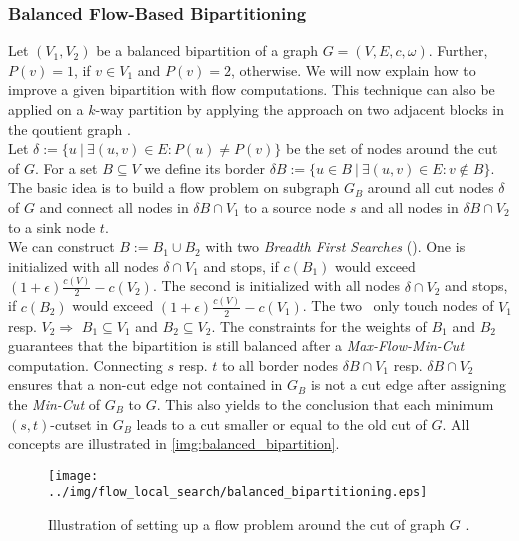 \subsubsection{Balanced Flow-Based Bipartitioning}
\label{sec:balanced_bipartitioning}
Let $(V_1,V_2)$ be a balanced bipartition of a graph $G = (V,E,c,\omega)$. 
Further, $P(v) = 1$, if $v \in V_1$ and
$P(v) = 2$, otherwise. We will now explain how to improve a given
bipartition with flow computations. This technique can also be applied on a $k$-way 
partition by applying the approach on two adjacent blocks in the qoutient graph \cite{sanders2011engineering}. \\
Let $\delta := \{ u\ |\ \exists (u,v) \in E: P(u) \neq P(v) \}$ be the set of nodes
around the cut of $G$. For a set $B \subseteq V$ we define its border 
$\delta B := \{u \in B\ |\ \exists (u,v) \in E: v \notin B\}$.
The basic idea is to build a flow problem on subgraph $G_B$ around all cut nodes $\delta$ of 
$G$ and connect all nodes in $\delta B \cap V_1$ to a source node $s$ and all nodes in 
$\delta B \cap V_2$ to a sink node $t$. \\
We can construct $B := B_1 \cup B_2$ with two \emph{Breadth First Searches} (\BFS). 
One is initialized with all nodes $\delta \cap V_1$ and stops, if $c(B_1)$ would 
exceed $(1+\epsilon)\frac{c(V)}{2} - c(V_2)$. The second is initialized with 
all nodes $\delta \cap V_2$ and stops, if $c(B_2)$ would exceed 
$(1+\epsilon)\frac{c(V)}{2} - c(V_1)$. The two \BFS~only touch nodes of $V_1$ resp. $V_2 \Rightarrow$
$B_1 \subseteq V_1$ and $B_2 \subseteq V_2$. The constraints for the weights of $B_1$
and $B_2$ guarantees that the bipartition is still balanced after a \emph{Max-Flow-Min-Cut}
computation. Connecting $s$ resp. $t$ to all border nodes $\delta B \cap V_1$ resp.
$\delta B \cap V_2$ ensures that a non-cut edge not contained in $G_B$ is not a cut edge after
assigning the \emph{Min-Cut} of $G_B$ to $G$. This also yields to the conclusion that each
minimum $(s,t)$-cutset in $G_B$ leads to a cut smaller or equal to the old cut of $G$. All
concepts are illustrated in \autoref{img:balanced_bipartition}.

\begin{figure}
\centering
\texttt{[image: ../img/flow\_local\_search/balanced\_bipartitioning.eps]}
\caption{Illustration of setting up a flow problem around the cut of graph $G$ \cite{andersen2008algorithm}.}
\label{img:balanced_bipartition}
\end{figure}


